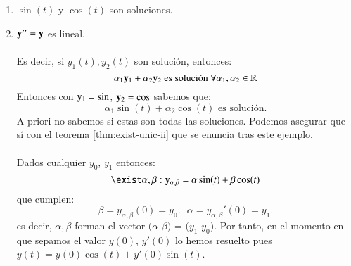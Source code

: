 \begin{eg}[Muelles]
    \begin{enumerate}
        \item $\sin (t)$ y $\cos(t)$ son soluciones.
        \item $\mathbf{y}'' = \mathbf{y}$ es lineal.\\\\
        Es decir, si $y_1(t), y_2(t)$ son solución, entonces:
        $$
            \alpha_1 \mathbf{y}_1 + \alpha_2 \mathbf{y}_2 \text{ es solución } \forall \alpha_1, \alpha_2 \in \mathbb{R}
        $$
        Entonces con $\mathbf{y}_1 = \sin$, $\mathbf{y}_2 = \cos$ sabemos que:
        $$
            \alpha_1\sin(t) + \alpha_2\cos(t) \text{ es solución.}
        $$
        A priori no sabemos si estas son todas las soluciones. Podemos asegurar que sí con el teorema \ref{thm:exist-unic-ii} que se enuncia tras este ejemplo.\\\\
        Dados cualquier $y_0$, $y_1$ entonces:
        $$
            \exist \alpha, \beta : \mbf{y}_{\alpha, \beta} = \alpha \sin (t) + \beta \cos (t)
        $$
        que cumplen:
        $$
            \beta = y_{\alpha, \beta} (0) = y_0.\text{         } \alpha = y_{\alpha, \beta}'(0) = y_1.
        $$
        es decir, $\alpha, \beta$ forman el vector $(\alpha$ $\beta)$ = $(y_1$ $y_0)$. Por tanto, en el momento en que sepamos el valor $y(0)$, $y'(0)$ lo hemos resuelto pues $y(t) = y(0) \cos (t) + y'(0) \sin (t)$.
    \end{enumerate}
\end{eg}
